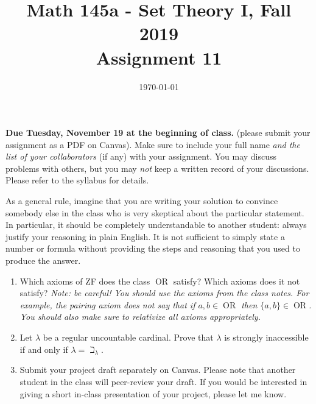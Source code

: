 \documentclass{amsart}
\title[Math 145a, Fall 2019: assignment 11]{Math 145a - Set Theory I, Fall 2019 \\ Assignment 11}
\date{\today}
\theoremstyle{definition}
\newcommand{\Or}{\operatorname{OR}}
\newcommand{\OR}{\Or}
\begin{document}

\vspace*{-10em}

\maketitle

\textbf{Due Tuesday, November 19 at the beginning of class.} (please submit your assignment as a PDF on Canvas). Make sure to include your full name \emph{and the list of your collaborators} (if any) with your assignment. You may discuss problems with others, but you may \emph{not} keep a written record of your discussions. Please refer to the syllabus for details.

As a general rule, imagine that you are writing your solution to convince somebody else in the class who is very skeptical about the particular statement. In particular, it should be completely understandable to another student: always justify your reasoning in plain English. It is not sufficient to simply state a number or formula without providing the steps and reasoning that you used to produce the answer.

\begin{enumerate}
\item Which axioms of ZF does the class $\OR$ satisfy? Which axioms does it not satisfy? \emph{Note: be careful! You should use the axioms from the class notes. For example, the pairing axiom does not say that if $a, b \in \OR$ then $\{a, b\} \in \OR$. You should also make sure to relativize all axioms appropriately.}      
\item Let $\lambda$ be a regular uncountable cardinal. Prove that $\lambda$ is strongly inaccessible if and only if $\lambda = \beth_\lambda$.
\item Submit your project draft separately on Canvas. Please note that another student in the class will peer-review your draft. If you would be interested in giving a short in-class presentation of your project, please let me know.
\end{enumerate}
\end{document}
